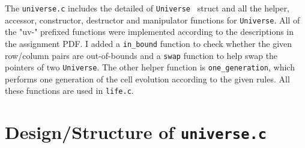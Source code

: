 \documentclass[12pt]{article}
\begin{document}
The \texttt{universe.c} includes the detailed of \texttt{Universe } struct and all the helper, accessor, constructor, destructor and manipulator functions for \texttt{Universe}. All of the "uv-" prefixed functions were implemented according to the descriptions in the assignment PDF. I added a \texttt{in\_bound} function to check whether the given row/column pairs are out-of-bounds and a \texttt{swap} function to help swap the pointers of two \texttt{Universe}. The other helper function is \texttt{one\_generation}, which performs one generation of the cell evolution according to the given rules. All these functions are used in \texttt{life.c}.

\section{Design/Structure of \texttt{universe.c}}
\end{document}
